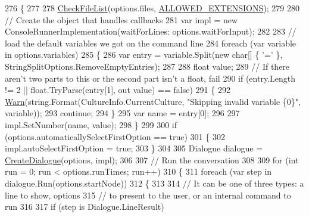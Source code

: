 \begin{DoxyCode}
276         \{
277 
278             \hyperlink{a00197_ad77564b25725a771f0fd4da430582e6f}{CheckFileList}(options.files, \hyperlink{a00197_a0979de7ea02c8c0375b8220a12e6575e}{ALLOWED\_EXTENSIONS});
279 
280             \textcolor{comment}{// Create the object that handles callbacks}
281             var impl = \textcolor{keyword}{new} ConsoleRunnerImplementation(waitForLines: options.waitForInput);
282 
283             \textcolor{comment}{// load the default variables we got on the command line}
284             \textcolor{keywordflow}{foreach} (var variable \textcolor{keywordflow}{in} options.variables)
285             \{
286                 var entry = variable.Split(\textcolor{keyword}{new} \textcolor{keywordtype}{char}[] \{ \textcolor{charliteral}{'='} \}, StringSplitOptions.RemoveEmptyEntries);
287 
288                 \textcolor{keywordtype}{float} value;
289                 \textcolor{comment}{// If there aren't two parts to this or the second part isn't a float, fail}
290                 \textcolor{keywordflow}{if} (entry.Length != 2 || \textcolor{keywordtype}{float}.TryParse(entry[1], out value) == \textcolor{keyword}{false})
291                 \{
292                     \hyperlink{a00197_a979bb6f049b6c5294f745a19e24ddd9d}{Warn}(\textcolor{keywordtype}{string}.Format(CultureInfo.CurrentCulture, \textcolor{stringliteral}{"Skipping invalid variable \{0\}"}, 
      variable));
293                     \textcolor{keywordflow}{continue};
294                 \}
295                 var name = entry[0];
296 
297                 impl.SetNumber(name, value);
298             \}
299 
300             \textcolor{keywordflow}{if} (options.automaticallySelectFirstOption == \textcolor{keyword}{true})
301             \{
302                 impl.autoSelectFirstOption = \textcolor{keyword}{true};
303             \}
304 
305             Dialogue dialogue = \hyperlink{a00197_aab244361a510cee18ad2f636d110e0d5}{CreateDialogue}(options, impl);
306 
307             \textcolor{comment}{// Run the conversation}
308 
309             \textcolor{keywordflow}{for} (\textcolor{keywordtype}{int} run = 0; run < options.runTimes; run++)
310             \{
311                 \textcolor{keywordflow}{foreach} (var step \textcolor{keywordflow}{in} dialogue.Run(options.startNode))
312                 \{
313 
314                     \textcolor{comment}{// It can be one of three types: a line to show, options}
315                     \textcolor{comment}{// to present to the user, or an internal command to run}
316 
317                     \textcolor{keywordflow}{if} (step is Dialogue.LineResult)

\end{DoxyCode}
